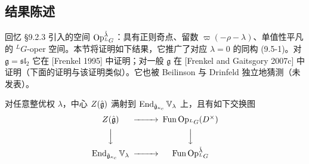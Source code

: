 \subsection{结果陈述}

回忆 §9.2.3 引入的空间 $\operatorname{Op}^{\check\lambda}_{{}^LG}$：具有正则奇点、留数 $\varpi(-\rho-\lambda)$、单值性平凡的 ${}^LG$-oper 空间。本节将证明如下结果，它推广了对应 $\lambda=0$ 的同构 (9.5-1)。对 $\mathfrak{g}=\mathfrak{sl}_2$ 它在 [Frenkel 1995] 中证明；对一般 $\mathfrak{g}$ 在 [Frenkel and Gaitsgory 2007c] 中证明（下面的证明与该证明类似）。它也被 Beilinson 与 Drinfeld 独立地猜测（未发表）。

\begin{theorem}
    对任意整优权 $\lambda$，中心 $Z(\hat{\mathfrak{g}})$ 满射到 $\operatorname{End}_{\hat{\mathfrak{g}}_{\kappa_c}}\mathbb{V}_\lambda$ 上，且有如下交换图
    \[
        \begin{CD}
            Z(\gghat) @>>> \operatorname{Fun}\Op_{{}^LG}(D^\times)\\
            @VVV @VVV\\
            \operatorname{End}_{\gghat_{\kappa_c}}\mathbb{V}_\lambda @>>>
                \operatorname{Fun}\Op^{\check\lambda}_{{}^LG}
        \end{CD}
    \]
\end{theorem}


